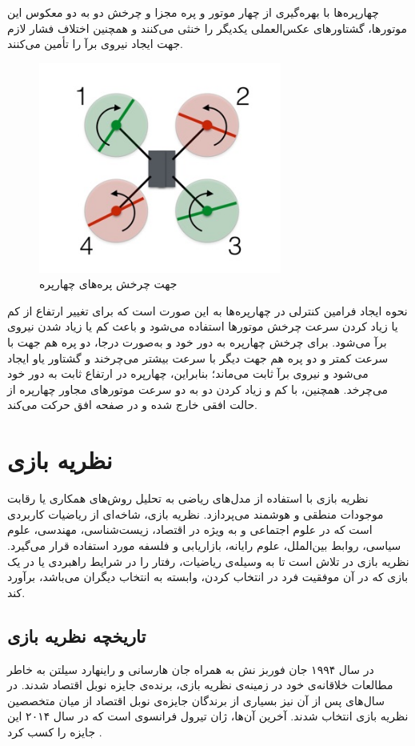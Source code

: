 چهارپره‌ها با بهره‌گیری از چهار موتور و پره مجزا و چرخش دو به دو معکوس این موتورها، گشتاورهای عکس‌العملی یکدیگر را خنثی می‌کنند و همچنین اختلاف فشار لازم جهت ایجاد نیروی برآ را تأمین می‌کنند.

\begin{figure}[H]
	\includegraphics[width=8cm]{../Figures/introduction/Quadblade.jpg}
	\centering
	\caption{جهت چرخش پره‌های چهارپره
		\cite{Quadhowfly}}
\end{figure}

نحوه ایجاد فرامین کنترلی در چهارپره‌ها به این صورت است که برای تغییر ارتفاع از کم یا زیاد کردن سرعت چرخش موتورها استفاده می‌شود و باعث کم یا زیاد شدن نیروی برآ می‌شود. برای چرخش چهارپره به دور خود و به‌صورت درجا، دو پره هم جهت با سرعت کمتر و دو پره هم جهت دیگر با سرعت بیشتر می‌چرخند و گشتاور یاو ایجاد می‌شود و نیروی برآ ثابت می‌ماند؛
 بنابراین، چهارپره در ارتفاع ثابت به دور خود می‌چرخد. همچنین، با کم و زیاد کردن دو به دو سرعت موتورهای مجاور چهارپره از حالت افقی خارج شده و در صفحه افق حرکت می‌کند.


\section{نظریه بازی}
نظریه بازی با استفاده از مدل‌های ریاضی به تحلیل روش‌های همکاری یا رقابت موجودات منطقی و هوشمند می‌پردازد. نظریه بازی، شاخه‌ای از ریاضیات کاربردی است که در علوم اجتماعی و به ویژه در اقتصاد، زیست‌شناسی، مهندسی، علوم سیاسی، روابط بین‌الملل، علوم رایانه، بازاریابی و فلسفه مورد استفاده قرار می‌گیرد. نظریه بازی در تلاش است تا به وسیله‌ی ریاضیات، رفتار را در شرایط راهبردی یا در یک بازی که در آن موفقیت فرد در انتخاب کردن، وابسته به انتخاب دیگران می‌باشد، برآورد کند.
\subsection{تاریخچه نظریه بازی}
در سال ۱۹۹۴ جان فوربز نش به همراه جان هارسانی و راینهارد سیلتن به خاطر مطالعات خلاقانه‌ی خود در زمینه‌ی نظریه بازی، برنده‌ی جایزه نوبل اقتصاد شدند. در سال‌های پس از آن نیز بسیاری از برندگان جایزه‌ی نوبل اقتصاد از میان متخصصین نظریه بازی انتخاب شدند. آخرین آن‌ها، ژان تیرول فرانسوی است که در سال ۲۰۱۴ این جایزه را کسب کرد \cite{nobel}.
